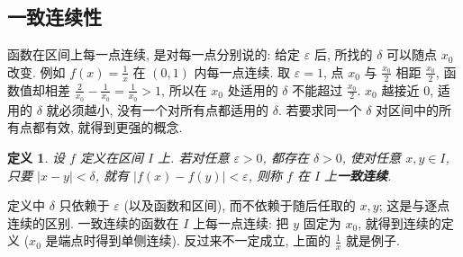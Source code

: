 \documentclass[UTF8,openany]{ctexbook}
\theoremstyle{chinesetextbook}
\newtheorem*{definitionsingle}{定义}
\begin{document}
\subsection{一致连续性}
函数在区间上每一点连续, 是对每一点分别说的: 给定 $\varepsilon$ 后, 所找的 $\delta$ 可以随点 $x_0$ 改变. 例如 $\displaystyle f(x)=\frac1x$ 在 $(0,1)$ 内每一点连续. 取 $\varepsilon=1$, 点 $x_0$ 与 $\displaystyle\frac{x_0}2$ 相距 $\displaystyle\frac{x_0}2$, 函数值却相差 $\displaystyle\frac2{x_0}-\frac1{x_0}=\frac1{x_0}>1$, 所以在 $x_0$ 处适用的 $\delta$ 不能超过 $\displaystyle\frac{x_0}2$. $x_0$ 越接近 $0$, 适用的 $\delta$ 就必须越小, 没有一个对所有点都适用的 $\delta$. 若要求同一个 $\delta$ 对区间中的所有点都有效, 就得到更强的概念.
\begin{definitionsingle}
设 $f$ 定义在区间 $I$ 上. 若对任意 $\varepsilon>0$, 都存在 $\delta>0$, 使对任意 $x,y\in I$, 只要 $|x-y|<\delta$, 就有 $|f(x)-f(y)|<\varepsilon$, 则称 $f$ 在 $I$ 上\textbf{一致连续}.
\end{definitionsingle}
定义中 $\delta$ 只依赖于 $\varepsilon$ (以及函数和区间), 而不依赖于随后任取的 $x,y$; 这是与逐点连续的区别. 一致连续的函数在 $I$ 上每一点连续: 把 $y$ 固定为 $x_0$, 就得到连续的定义 ($x_0$ 是端点时得到单侧连续). 反过来不一定成立, 上面的 $\displaystyle\frac1x$ 就是例子.
\end{document}
